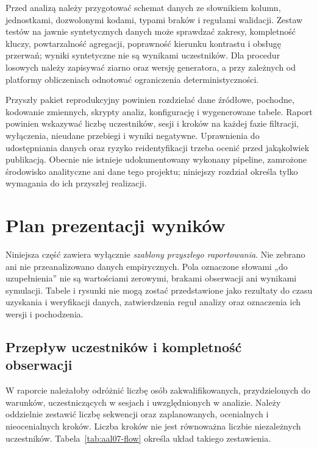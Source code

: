 \documentclass[11pt,a4paper]{article}
\begin{document}
Przed analizą należy przygotować schemat danych ze słownikiem kolumn, jednostkami, dozwolonymi kodami, typami braków i regułami walidacji. Zestaw testów na jawnie syntetycznych danych może sprawdzać zakresy, kompletność kluczy, powtarzalność agregacji, poprawność kierunku kontrastu i obsługę przerwań; wyniki syntetyczne nie są wynikami uczestników. Dla procedur losowych należy zapisywać ziarno oraz wersję generatora, a przy zależnych od platformy obliczeniach odnotować ograniczenia deterministyczności.

Przyszły pakiet reprodukcyjny powinien rozdzielać dane źródłowe, pochodne, kodowanie zmiennych, skrypty analiz, konfigurację i wygenerowane tabele. Raport powinien wskazywać liczbę uczestników, sesji i kroków na każdej fazie filtracji, wyłączenia, nieudane przebiegi i wyniki negatywne. Uprawnienia do udostępniania danych oraz ryzyko reidentyfikacji trzeba ocenić przed jakąkolwiek publikacją. Obecnie nie istnieje udokumentowany wykonany pipeline, zamrożone środowisko analityczne ani dane tego projektu; niniejszy rozdział określa tylko wymagania do ich przyszłej realizacji.

\section{Plan prezentacji wyników}
Niniejsza część zawiera wyłącznie \emph{szablony przyszłego raportowania}. Nie zebrano ani nie przeanalizowano danych empirycznych. Pola oznaczone słowami „do uzupełnienia” nie są wartościami zerowymi, brakami obserwacji ani wynikami symulacji. Tabele i rysunki nie mogą zostać przedstawione jako rezultaty do czasu uzyskania i weryfikacji danych, zatwierdzenia reguł analizy oraz oznaczenia ich wersji i pochodzenia.

\subsection{Przepływ uczestników i kompletność obserwacji}
W raporcie należałoby odróżnić liczbę osób zakwalifikowanych, przydzielonych do warunków, uczestniczących w sesjach i uwzględnionych w analizie. Należy oddzielnie zestawić liczbę sekwencji oraz zaplanowanych, ocenialnych i nieocenialnych kroków. Liczba kroków nie jest równoważna liczbie niezależnych uczestników. Tabela~\ref{tab:aal07-flow} określa układ takiego zestawienia.
\end{document}
